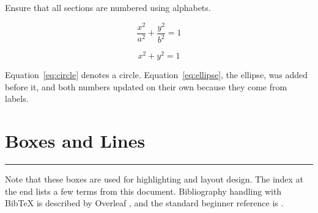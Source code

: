 \documentclass[12pt,a4paper]{article}
\begin{document}
Ensure that all sections are numbered using alphabets.

\begin{equation}\label{eq:ellipse}
    \frac{x^2}{a^2} + \frac{y^2}{b^2} = 1
\end{equation}

\begin{equation}\label{eq:circle}
    x^2 + y^2 = 1
\end{equation}

Equation~\ref{eq:circle} denotes a circle. Equation~\ref{eq:ellipse}, the
ellipse, was added before it, and both numbers updated on their own because
they come from labels.

\section{Boxes and Lines}

\noindent\usebox{\notebox}

\noindent\usebox{\notebox}

\noindent\usebox{\notebox}

\vspace{0.5cm}
\noindent{}

\vspace{0.3cm}
\noindent\rule{\linewidth}{0.4pt}

Note that these boxes are used for highlighting and layout design. The index
at the end lists a few terms from this document. Bibliography handling with
Bib\TeX{} is described by Overleaf \cite{overleafbib}, and the standard
beginner reference is \cite{oetiker2021}.

\printindex



\end{document}
